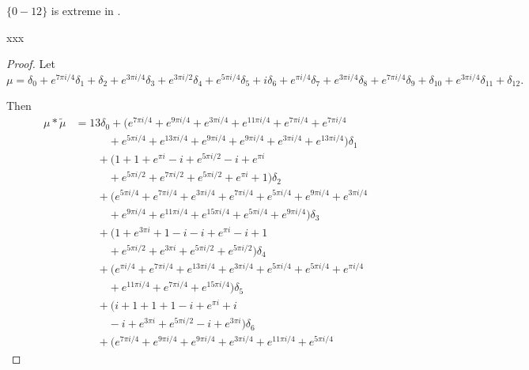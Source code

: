  \begin{prop}\label{prop13in14}
  $\{0-12\}$ is extreme in .
 \end{prop}
 xxx
 \begin{proof} Let %
$\mu =
  \delta_{0}  +   e^{ 7\pi i  / 4}\delta_{1}  +   \delta_{2}  +   e^{ 3\pi i  / 4}\delta_{3}  +   e^{ 3\pi i  / 2}\delta_{4}  +   e^{ 5\pi i  / 4}\delta_{5}  %
+   i\delta_{6}  +   e^{ \pi i  / 4}\delta_{7}  +   e^{ 3\pi i  / 4}\delta_{8}  +   e^{ 7\pi i  / 4}\delta_{9}  +  \delta_{10}  +   e^{ 3\pi i  / 4}\delta_{11}  +   \delta_{12}.
$%

  Then
\begin{align*}\mu * \tilde\mu&=   13\delta_{0}   +  \big( e^{ 7 \pi i / 4}+ e^{ 9 \pi i / 4}+ e^{ 3 \pi i / 4}+ e^{ 11 \pi i / 4}+ e^{ 7 \pi i / 4}+ e^{ 7 \pi i / 4}
\\& \quad\qquad + e^{ 5 \pi i / 4}+ e^{ 13 \pi i / 4}+ e^{ 9 \pi i / 4}+ e^{ 9 \pi i / 4}+ e^{ 3 \pi i / 4}+ e^{ 13 \pi i / 4}\big)\delta_{1} 
\\& \qquad  +  \big( 1+ 1+ e^{ \pi  i}- i+ e^{ 5 \pi i / 2}- i+ e^{ \pi  i}
\\& \quad\qquad + e^{ 5 \pi i / 2}+ e^{ 7 \pi i / 2}+ e^{ 5 \pi i / 2}+ e^{ \pi  i}+ 1\big)\delta_{2} 
\\& \qquad  +  \big( e^{ 5 \pi i / 4}+ e^{ 7 \pi i / 4}+ e^{ 3 \pi i / 4}+ e^{ 7 \pi i / 4}+ e^{ 5 \pi i / 4}+ e^{ 9 \pi i / 4}+ e^{ 3 \pi i / 4}
\\& \quad\qquad+ e^{ 9 \pi i / 4}+ e^{ 11 \pi i / 4}+ e^{ 15 \pi i / 4}+ e^{ 5 \pi i / 4}+ e^{ 9 \pi i / 4}\big)\delta_{3} 
\\& \qquad  +  \big( 1+ e^{ 3 \pi i}+ 1- i- i+ e^{ \pi  i}- i+ 1
\\& \quad\qquad
+ e^{ 5 \pi i / 2}+ e^{ 3 \pi i}+ e^{ 5 \pi i / 2}+ e^{ 5 \pi i / 2}\big)\delta_{4} 
\\& \qquad  +  \big( e^{\pi i / 4}+ e^{ 7 \pi i / 4}+ e^{ 13 \pi i / 4}+ e^{ 3 \pi i / 4}+ e^{ 5 \pi i / 4}+ e^{ 5 \pi i / 4}+ e^{\pi i / 4}
\\& \quad\qquad
+ e^{ 11 \pi i / 4}+ e^{ 7 \pi i / 4}+ e^{ 15 \pi i / 4}\big)\delta_{5} 
\\& \qquad  +  \big(  i + 1+ 1+ 1- i+ e^{ \pi  i}+  i 
\\& \quad\qquad
- i+ e^{ 3 \pi i}+ e^{ 5 \pi i / 2}- i+ e^{ 3 \pi i}\big)\delta_{6}
 \\& \qquad  +  \big( e^{ 7 \pi i / 4}+ e^{ 9 \pi i / 4}+ e^{ 9 \pi i / 4}+ e^{ 3 \pi i / 4}+ e^{ 11 \pi i / 4}+ e^{ 5 \pi i / 4}

\end{align*}
\end{proof}
